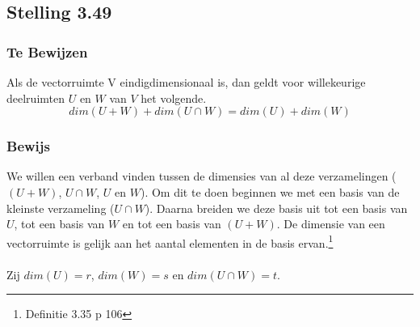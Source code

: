 \documentclass[lineaire_algebra_oplossingen.tex]{subfiles}
\begin{document}
\subsection{Stelling 3.49}
\subsubsection*{Te Bewijzen}
Als de vectorruimte V eindigdimensionaal is, dan geldt voor willekeurige deelruimten $U$ en $W$ van $V$ het volgende.
\[
dim(U+W) + dim(U\cap W) = dim(U) + dim(W)
\]
\subsubsection*{Bewijs}
We willen een verband vinden tussen de dimensies van al deze verzamelingen ($(U+W)$, $U\cap W$, $U$ en $W$). Om dit te doen beginnen we met een basis van de kleinste verzameling ($U \cap W$). Daarna breiden we deze basis uit tot een basis van $U$, tot een basis van $W$ en tot een basis van $(U + W)$. De dimensie van een vectorruimte is gelijk aan het aantal elementen in de basis ervan.\footnote{Definitie 3.35 p 106}\\\\
Zij $dim(U) = r$, $dim(W)=s$ en $dim(U\cap W) = t$.
\end{document}
